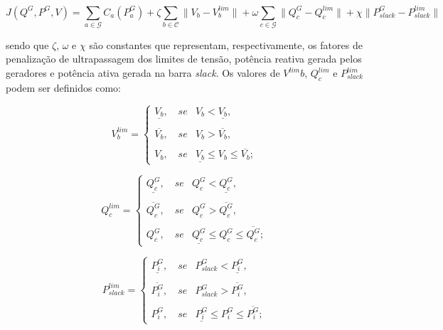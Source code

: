 \documentclass[
	12pt,				%
	openany,			%
	twoside,			%
	a4paper,			%
	chapter=TITLE,		%
	section=Title,		%
	subsection=Title,	%
	subsubsection=Title,%
	english,			%
	french,				%
	spanish,			%
	brazil			%
	]{abntex2}
\begin{document}
\begin{ERRATA}
\begin{equation}\label{fit2}
J(Q^G, P^G, V) = \sum_{a \in \mathcal{G}}{C_a(P^G_a)} + \zeta \sum_{b \in \mathcal{C}}{\lVert V_b - V^{lim}_b \rVert} + \omega \sum_{c \in \mathcal{G}}{\lVert Q^G_c - Q^{lim}_c \rVert} + \chi \lVert P^G_{slack} - P^{lim}_{slack} \rVert
\end{equation}

\noindent sendo que $\zeta$, $\omega$ e $\chi$ são constantes que representam, respectivamente, os fatores de penalização de ultrapassagem dos limites de tensão, potência reativa gerada pelos geradores e potência ativa gerada na barra \emph{slack}. Os valores de $V^{lim}b$, $Q^{lim}_c$ e $P^{lim}_{slack}$ podem ser definidos como:

\begin{equation}\label{proc1}
V^{lim}_b = \begin{cases}
\underline{V_b}, \quad se & V_b < \underline{V_b},\\\\
\overline{V_b}, \quad se & V_b > \overline{V_b},\\\\
V_b, \quad se & \underline{V_b} \leq V_b \leq \overline{V_b};
\end{cases}
\end{equation}


\begin{equation}\label{proc2}
Q^{lim}_c = \begin{cases}
\underline{Q^G_c}, \quad se & Q^G_c < \underline{Q^G_c},\\\\
\overline{Q^G_c}, \quad se & Q^G_c > \overline{Q^G_c},\\\\
Q^G_c, \quad se & \underline{Q^G_c} \leq Q^G_c \leq \overline{Q^G_c};
\end{cases}
\end{equation}


\begin{equation}\label{proc20}
P^{lim}_{slack} = \begin{cases}
\underline{P^G_{i}}, \quad se & P^{G}_{slack} < \underline{P^G_{i}},\\\\
\overline{P^G_{i}}, \quad se & P^{G}_{slack} > \overline{P^G_{i}},\\\\
P^G_{i}, \quad se & \underline{P^G_{i}} \leq P^G_{i} \leq \overline{P^G_{i}};
\end{cases}
\end{equation}


\end{ERRATA}
\end{document}

